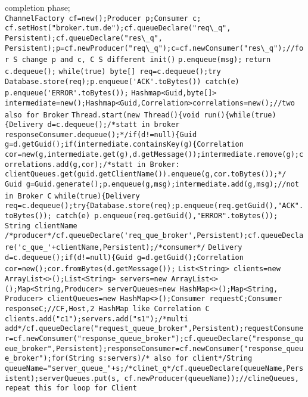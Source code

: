 completion phase;
%
%
%
%
%
\\
\lstinline{ChannelFactory cf=new();Producer p;Consumer c;}
\lstinline{cf.setHost("broker.tum.de");cf.queueDeclare("req\_q", Persistent);cf.queueDeclare("res\_q", Persistent);p=cf.newProducer("req\_q");c=cf.newConsumer("res\_q");//for S change p and c, C S different init()}
\lstinline{p.enqueue(msg);}
\lstinline{return c.dequeue();}
\lstinline{while(true) byte[] req=c.dequeue();try Database.store(req);p.enqueue('ACK'.toBytes()) catch(e) p.enqueue('ERROR'.toBytes());}
%
%
%
\bluetext{+}
\lstinline{Hashmap<Guid,byte[]> intermediate=new();Hashmap<Guid,Correlation>correlations=new();//two also for Broker}
\lstinline{Thread.start(new Thread(){void run(){while(true){Delivery d=c.dequeue();/*statt in broker responseConsumer.dequeue();*/if(d!=null){Guid g=d.getGuid();if(intermediate.containsKey(g){Correlation cor=new(g,intermediate.get(g),d.getMessage());intermediate.remove(g);correlations.add(g,cor);/*statt in Broker: clientQueues.get(guid.getClientName()).enqueue(g,cor.toBytes());*/}
\lstinline{Guid g=Guid.generate();p.enqueue(g,msg);intermediate.add(g,msg);//not in Broker C}
\lstinline{while(true){Delivery req=c.dequeue();try{Database.store(req);p.enqueue(req.getGuid(),"ACK".toBytes()); catch(e) p.enqueue(req.getGuid(),"ERROR".toBytes());}
%
%
%
\bluetext{+}
\lstinline{String clientName}
\bluetext{+}
\lstinline{/*producer*/cf.queueDeclare('req_que_broker',Persistent);cf.queueDeclare('c_que_'+clientName,Persistent);/*consumer*/}
\lstinline{Delivery d=c.dequeue();if(d!=null){Guid g=d.getGuid();Correlation cor=new();cor.fromBytes(d.getMessage());}
\bluetext{+}
\lstinline{List<String> clients=new ArrayList<>();List<String> servers=new ArrayList<>();Map<String,Producer> serverQueues=new HashMap<>();Map<String, Producer> clientQueues=new HashMap<>();Consumer requestC;Consumer responseC;//CF,Host,2 HashMap like Correlation C}
\lstinline{clients.add("c1");servers.add("s1");/*multi add*/cf.queueDeclare("request_queue_broker",Persistent);requestConsumer=cf.newConsumer("response_queue_broker");cf.queueDeclare("response_queue_broker",Persistent);responseConsumer=cf.newConsumer("response_queue_broker");for(String s:servers)/* also for client*/String queueName="server_queue_"+s;/*clinet_q*/cf.queueDeclare(queueName,Persistent);serverQueues.put(s, cf.newProducer(queueName));//clineQueues, repeat this for loop for Client}
